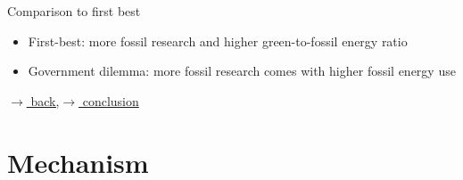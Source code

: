 \documentclass[11pt,aspectratio=169]{beamer}
\begin{document}
\begin{frame}{Comparison to first best}
\begin{figure}
\begin{subfigure}{0.45\textwidth}
		\end{subfigure}
	\end{figure}
	\vspace{1mm}
	\begin{block}{}
		\begin{itemize}
			\item First-best: more fossil research and higher green-to-fossil energy ratio
			\item \alert{Government dilemma:  more fossil research comes with higher fossil energy use}
		\end{itemize}
	\end{block}	
	
	\vspace{-5.5mm}
	\hfill	\hyperlink{mec}{\tiny{$\rightarrow$ back,}}\hyperlink{conc}{\tiny{$\rightarrow$ conclusion}}
\end{frame}




\section*{Mechanism}

\end{document}
